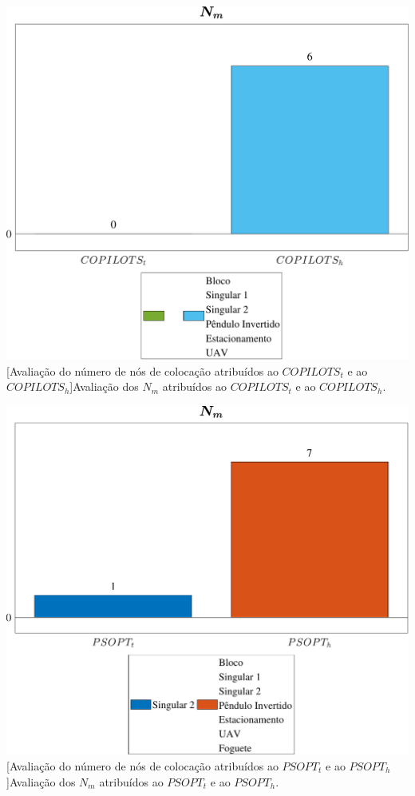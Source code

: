 \noindent	
\begin{minipage}{\textwidth}
	\vspace{\onelineskip}
	\centering
	\includegraphics[width=1\linewidth]{fig/resultados/ranking/2/N}
	[Avaliação do número de nós de colocação atribuídos ao $ COPILOTS_t $ e ao $ COPILOTS_h $]{Avaliação dos $ N_m $ atribuídos ao $ COPILOTS_t $ e ao $ COPILOTS_h $.}
	\label{fig:resultados:conclusao:NthCOPILOTS}
	\vspace{\onelineskip}
\end{minipage}

\noindent	
\begin{minipage}{\textwidth}
	\vspace{\onelineskip}
	\centering
	\includegraphics[width=1\linewidth]{fig/resultados/ranking/1/N}
	[Avaliação do número de nós de colocação atribuídos ao $ PSOPT_t $ e ao $ PSOPT_h $]{Avaliação dos $ N_m $ atribuídos ao $ PSOPT_t $ e ao $ PSOPT_h $.}
	\label{fig:resultados:conclusao:NthPSOPT}
	\vspace{\onelineskip}
\end{minipage}


